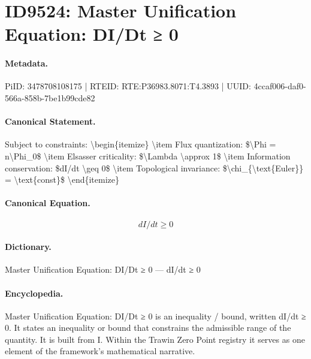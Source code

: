 \section*{ID9524: Master Unification Equation: DI/Dt ≥ 0}
\paragraph{Metadata.}
PiID: 3478708108175 | RTEID: RTE:P36983.8071:T4.3893 | UUID: 4ccaf006-daf0-566a-858b-7be1b99cde82

\paragraph{Canonical Statement.}
Subject to constraints: \textbackslash{}begin\{itemize\} \textbackslash{}item Flux quantization: \$\textbackslash{}Phi = n\textbackslash{}Phi\_0\$ \textbackslash{}item Elsasser criticality: \$\textbackslash{}Lambda \textbackslash{}approx 1\$ \textbackslash{}item Information conservation: \$dI/dt \textbackslash{}geq 0\$ \textbackslash{}item Topological invariance: \$\textbackslash{}chi\_\{\textbackslash{}text\{Euler\}\} = \textbackslash{}text\{const\}\$ \textbackslash{}end\{itemize\}

\paragraph{Canonical Equation.}
\[
dI/dt \geq 0
\]

\paragraph{Dictionary.}
Master Unification Equation: DI/Dt ≥ 0 — dI/dt ≥ 0

\paragraph{Encyclopedia.}
Master Unification Equation: DI/Dt ≥ 0 is an inequality / bound, written dI/dt ≥ 0. It states an inequality or bound that constrains the admissible range of the quantity. It is built from I. Within the Trawin Zero Point registry it serves as one element of the framework's mathematical narrative.
